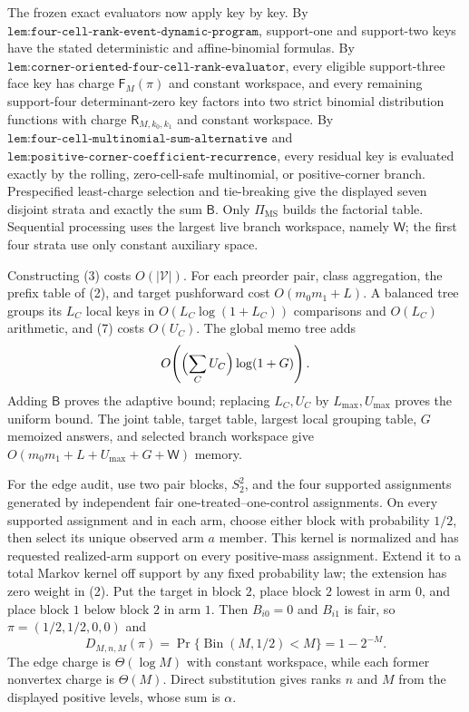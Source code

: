 The frozen exact evaluators now apply key by key. By \(\texttt{lem:four-cell-rank-event-dynamic-program}\), support-one and support-two keys have the stated deterministic and affine-binomial formulas. By \(\texttt{lem:corner-oriented-four-cell-rank-evaluator}\), every eligible support-three face key has charge \(\mathsf F_M(\pi)\) and constant workspace, and every remaining support-four determinant-zero key factors into two strict binomial distribution functions with charge \(\mathsf R_{M,k_0,k_1}\) and constant workspace. By \(\texttt{lem:four-cell-multinomial-sum-alternative}\) and \(\texttt{lem:positive-corner-coefficient-recurrence}\), every residual key is evaluated exactly by the rolling, zero-cell-safe multinomial, or positive-corner branch. Prespecified least-charge selection and tie-breaking give the displayed seven disjoint strata and exactly the sum \(\mathsf B\). Only \(\Pi_{\mathrm{MS}}\) builds the factorial table. Sequential processing uses the largest live branch workspace, namely \(\mathsf W\); the first four strata use only constant auxiliary space.

Constructing (3) costs \(O(|\mathcal V|)\). For each preorder pair, class aggregation, the prefix table of (2), and target pushforward cost \(O(m_0m_1+L)\). A balanced tree groups its \(L_C\) local keys in \(O(L_C\log(1+L_C))\) comparisons and \(O(L_C)\) arithmetic, and (7) costs \(O(U_C)\). The global memo tree adds
\[
O\!\left(\Bigl(\sum_CU_C\Bigr)\log(1+G)\right).
\]
Adding \(\mathsf B\) proves the adaptive bound; replacing \(L_C,U_C\) by \(L_{\max},U_{\max}\) proves the uniform bound. The joint table, target table, largest local grouping table, \(G\) memoized answers, and selected branch workspace give \(O(m_0m_1+L+U_{\max}+G+\mathsf W)\) memory.

For the edge audit, use two pair blocks, \(S_2^2\), and the four supported assignments generated by independent fair one-treated--one-control assignments. On every supported assignment and in each arm, choose either block with probability \(1/2\), then select its unique observed arm \(a\) member. This kernel is normalized and has requested realized-arm support on every positive-mass assignment. Extend it to a total Markov kernel off support by any fixed probability law; the extension has zero weight in (2). Put the target in block \(2\), place block \(2\) lowest in arm \(0\), and place block \(1\) below block \(2\) in arm \(1\). Then \(B_{i0}=0\) and \(B_{i1}\) is fair, so \(\pi=(1/2,1/2,0,0)\) and
\[
D_{M,n,M}(\pi)=\Pr\{\operatorname{Bin}(M,1/2)<M\}=1-2^{-M}.
\]
The edge charge is \(\Theta(\log M)\) with constant workspace, while each former nonvertex charge is \(\Theta(M)\). Direct substitution gives ranks \(n\) and \(M\) from the displayed positive levels, whose sum is \(\alpha\).


